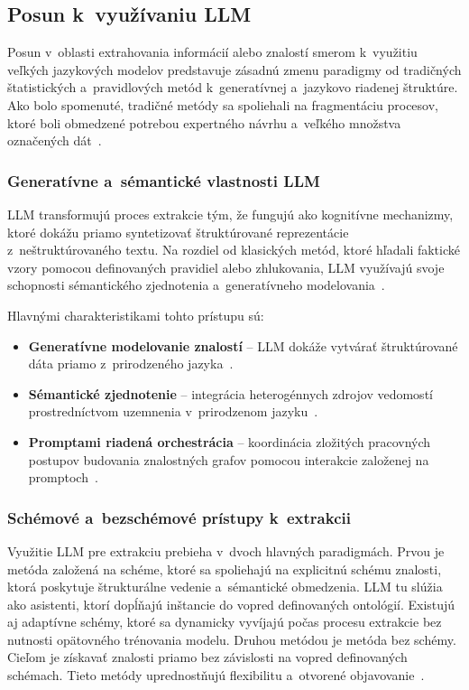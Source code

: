 \subsection{Posun k~využívaniu LLM}
Posun v~oblasti extrahovania informácií alebo znalostí smerom k~využitiu veľkých jazykových modelov predstavuje zásadnú zmenu paradigmy od tradičných štatistických a~pravidlových metód k~generatívnej a~jazykovo riadenej štruktúre. Ako bolo spomenuté, tradičné metódy sa spoliehali na fragmentáciu procesov, ktoré boli obmedzené potrebou expertného návrhu a~veľkého množstva označených dát~\cite{autKGconstruction2023,llmEmpKGcons2025}.


\subsubsection{Generatívne a~sémantické vlastnosti LLM}
LLM transformujú proces extrakcie tým, že fungujú ako kognitívne mechanizmy, ktoré dokážu priamo syntetizovať štruktúrované reprezentácie z~neštruktúrovaného textu. Na rozdiel od klasických metód, ktoré hľadali faktické vzory pomocou definovaných pravidiel alebo zhlukovania, LLM využívajú svoje schopnosti sémantického zjednotenia a~generatívneho modelovania~\cite{autKGconstruction2023,llmEmpKGcons2025}.

Hlavnými charakteristikami tohto prístupu sú:
\begin{itemize}
  \item \textbf{Generatívne modelovanie znalostí} – LLM dokáže vytvárať štruktúrované dáta priamo z~prirodzeného jazyka~\cite{llmEmpKGcons2025}.
  \item \textbf{Sémantické zjednotenie} – integrácia heterogénnych zdrojov vedomostí prostredníctvom uzemnenia v~prirodzenom jazyku~\cite{llmEmpKGcons2025}.
  \item \textbf{Promptami riadená orchestrácia} – koordinácia zložitých pracovných postupov budovania znalostných grafov pomocou interakcie založenej na promptoch~\cite{llmEmpKGcons2025}.
\end{itemize}



\subsubsection{Schémové a~bezschémové prístupy k~extrakcii}
Využitie LLM pre extrakciu prebieha v~dvoch hlavných paradigmách. Prvou je metóda založená na schéme, ktoré sa spoliehajú na explicitnú schému znalosti, ktorá poskytuje štrukturálne vedenie a~sémantické obmedzenia. LLM tu slúžia ako asistenti, ktorí dopĺňajú inštancie do vopred definovaných ontológií. Existujú aj adaptívne schémy, ktoré sa dynamicky vyvíjajú počas procesu extrakcie bez nutnosti opätovného trénovania modelu. Druhou metódou je metóda bez schémy. Cieľom je získavať znalosti priamo bez závislosti na vopred definovaných schémach. Tieto metódy uprednostňujú flexibilitu a~otvorené objavovanie~\cite{llmEmpKGcons2025}.

